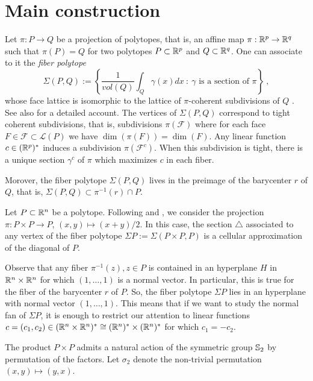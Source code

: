 
\section{Main construction} \label{s:mainconstruction}

Let $\pi: P\to Q$ be a projection of polytopes, that is, an affine map $\pi : \R^p \to \R^q$ such that $\pi(P)=Q$ for two polytopes $P\subset \R^p$ and $Q\subset\R^q$. One can associate to it the \emph{fiber polytope} \[\Sigma(P,Q):= \left\{ \frac{1}{vol(Q)}\int_Q \gamma(x)dx \ : \ \gamma \text{ is a section of }\pi \right\} \ , \] whose face lattice is isomorphic to the lattice of $\pi$-coherent subdivisions of $Q$ \cite{BilleraSturmfels92}. See also \cite[Chapter 9]{Ziegler95} for a detailed account. The vertices of $\Sigma(P,Q)$ correspond to tight coherent subdivisions, that is, subdivisions $\pi(\mathcal{F})$ where for each face $F \in \mathcal{F}\subset\mathcal{L}(P)$ we have $\dim(\pi(F))=\dim(F)$. Any linear function $c\in (\R^p)^{*}$ induces a subdivision $\pi(\mathcal{F}^c)$. When this subdivision is tight, there is a unique section $\gamma^c$ of $\pi$ which maximizes $c$ in each fiber.

Morover, the fiber polytope $\Sigma(P,Q)$ lives in the preimage of the barycenter $r$ of $Q$, that is, $\Sigma(P,Q)\subset\pi^{-1}(r)\cap P$.

Let $P\subset\R^n$ be a polytope. Following \cite{MTTV19} and \cite{GLA21}, we consider the projection $\pi : P\times P \to P$, $(x,y)\mapsto (x+y)/2$. In this case, the section $\triangle$ associated to any vertex of the fiber polytope $\Sigma P := \Sigma(P\times P,P)$ is a cellular approximation of the diagonal of $P$. 

Observe that any fiber $\pi^{-1}(z), z \in P$ is contained in an hyperplane $H$ in $\R^n\times\R^n$ for which $(1,\ldots,1)$ is a normal vector. In particular, this is true for the fiber of the barycenter $r$ of $P$. So, the fiber polytope $\Sigma P$ lies in an hyperplane with normal vector $(1,\ldots,1)$. This means that if we want to study the normal fan of $\Sigma P$, it is enough to restrict our attention to linear functions $c=(c_1,c_2) \in (\R^n \times \R^n)^{*}\cong (\R^n)^{*}\times (\R^n)^{*}$ for which $c_1=-c_2$.

The product $P\times P$ admits a natural action of the symmetric group $\S_2$ by permutation of the factors. Let $\sigma_2$ denote the non-trivial permutation $(x,y)\mapsto (y,x)$.

